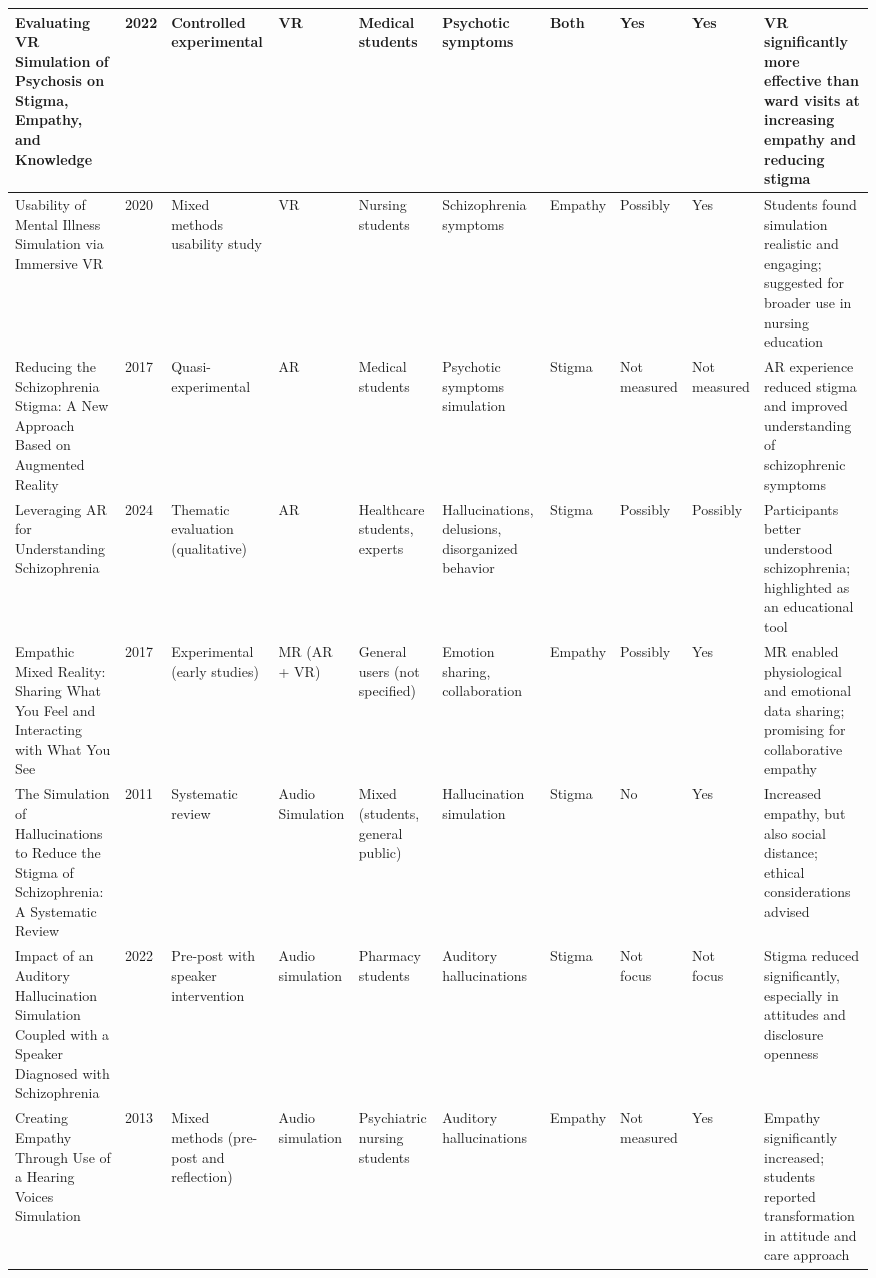 \begin{landscape}
\begin{longtable}{|P{2.8cm}|P{0.6cm}|P{1.8cm}|P{1.2cm}|P{1.2cm}|P{2cm}|P{1.2cm}|P{1.2cm}|P{1.2cm}|P{3cm}|}
    \hline
    Evaluating VR Simulation of Psychosis on Stigma, Empathy, and Knowledge & 2022 & Controlled experimental & VR & Medical students & Psychotic symptoms & Both & Yes & Yes & VR significantly more effective than ward visits at increasing empathy and reducing stigma \\
    \hline
    Usability of Mental Illness Simulation via Immersive VR & 2020 & Mixed methods usability study & VR & Nursing students & Schizophrenia symptoms & Empathy & Possibly & Yes & Students found simulation realistic and engaging; suggested for broader use in nursing education \\
    \hline

    Reducing the Schizophrenia Stigma: A New Approach Based on Augmented Reality & 2017 & Quasi-experimental & AR & Medical students & Psychotic symptoms simulation & Stigma & Not measured & Not measured & AR experience reduced stigma and improved understanding of schizophrenic symptoms \\
    \hline
    Leveraging AR for Understanding Schizophrenia & 2024 & Thematic evaluation (qualitative) & AR & Healthcare students, experts & Hallucinations, delusions, disorganized behavior & Stigma & Possibly & Possibly & Participants better understood schizophrenia; highlighted as an educational tool \\
    \hline
    Empathic Mixed Reality: Sharing What You Feel and Interacting with What You See & 2017 & Experimental (early studies) & MR (AR + VR) & General users (not specified) & Emotion sharing, collaboration & Empathy & Possibly & Yes & MR enabled physiological and emotional data sharing; promising for collaborative empathy \\
    \hline
    The Simulation of Hallucinations to Reduce the Stigma of Schizophrenia: A Systematic Review & 2011 & Systematic review & Audio Simulation & Mixed (students, general public) & Hallucination simulation & Stigma & No & Yes & Increased empathy, but also social distance; ethical considerations advised \\
    \hline
    Impact of an Auditory Hallucination Simulation Coupled with a Speaker Diagnosed with Schizophrenia & 2022 & Pre-post with speaker intervention & Audio simulation & Pharmacy students & Auditory hallucinations & Stigma & Not focus & Not focus & Stigma reduced significantly, especially in attitudes and disclosure openness \\
    \hline
    Creating Empathy Through Use of a Hearing Voices Simulation & 2013 & Mixed methods (pre-post and reflection) & Audio simulation & Psychiatric nursing students & Auditory hallucinations & Empathy & Not measured & Yes & Empathy significantly increased; students reported transformation in attitude and care approach \\
    \hline


\end{longtable}
\end{landscape}
